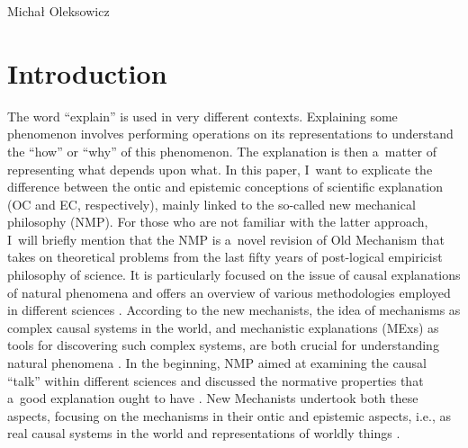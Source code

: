 \begin{artengenv}{Michał Oleksowicz}
\section{Introduction}
\lettrine[loversize=0.13,lines=2,lraise=-0.03,nindent=0em,findent=0.2pt]%
{T}{}he word ``explain'' is used in very different contexts. Explaining some phenomenon involves performing operations on its representations to understand the ``how'' or ``why'' of this phenomenon. The explanation is then a~matter of representing what depends upon what. In this paper, I~want to explicate the difference between the ontic and epistemic conceptions of scientific explanation (OC and EC, respectively), mainly linked to the so-called new mechanical philosophy (NMP). For those who are not familiar with the latter approach, I~will briefly mention that the NMP is a~novel revision of Old Mechanism that takes on theoretical problems from the last fifty years of post-logical empiricist philosophy of science. It is particularly focused on the issue of causal explanations of natural phenomena and offers an overview of various methodologies employed in different sciences
\parencites[][]{andersen_field_2014}[][]{andersen_field_2014-1}. %
 According to the new mechanists, the idea of mechanisms as complex causal systems in the world, and mechanistic explanations (MExs) as tools for discovering such complex systems, are both crucial for understanding natural phenomena 
\parencite[][]{machamer_thinking_2000}. %
 In the beginning, NMP aimed at examining the causal ``talk'' within different sciences and discussed the normative properties that a~good explanation ought to have 
\parencite[][]{kaiser_ontic_2014}. %
 New Mechanists undertook both these aspects, focusing on the mechanisms in their ontic and epistemic aspects, i.e., as real causal systems in the world and representations of worldly things 
\parencites*[][]{bechtel_explanation_2005}[][]{craver_when_2006}[][]{darden_thinking_2008}[][]{campaner_mechanistic_2013}[][]{levy_three_2013}[][]{levy_machine-likeness_2014}.%



\end{artengenv}
